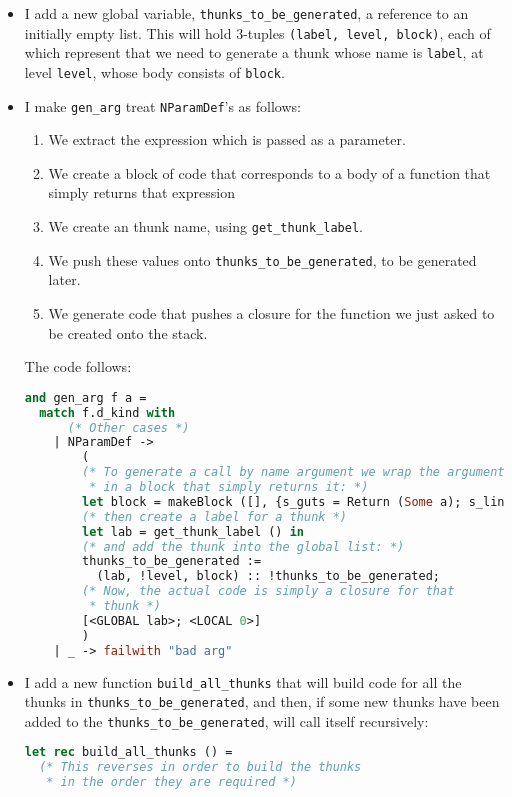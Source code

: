 \documentclass[a4paper,10pt]{article}
\begin{document}
\begin{itemize}
\item I add a new global variable, \texttt{thunks\_to\_be\_generated}, a reference to an initially empty list. This will hold 3-tuples \texttt{(label, level, block)}, each of which represent that we need to generate a thunk whose name is \texttt{label}, at level \texttt{level}, whose body consists of \texttt{block}.

\item I make \texttt{gen\_arg} treat \texttt{NParamDef}'s as follows:
    \begin{enumerate}
        \item We extract the expression which is passed as a parameter.
        \item We create a block of code that corresponds to a body of a function that simply returns that expression
        \item We create an thunk name, using \texttt{get\_thunk\_label}.
        \item We push these values onto \texttt{thunks\_to\_be\_generated}, to be generated later.
        \item We generate code that pushes a closure for the function we just asked to be created onto the stack.
    \end{enumerate}
    The code follows:
\begin{lstlisting}[language=ml]
and gen_arg f a = 
  match f.d_kind with
      (* Other cases *)
    | NParamDef ->
        (
        (* To generate a call by name argument we wrap the argument expression 
         * in a block that simply returns it: *)
        let block = makeBlock ([], {s_guts = Return (Some a); s_line = -1}) in
        (* then create a label for a thunk *)
        let lab = get_thunk_label () in
        (* and add the thunk into the global list: *)
        thunks_to_be_generated := 
          (lab, !level, block) :: !thunks_to_be_generated;
        (* Now, the actual code is simply a closure for that
         * thunk *)
        [<GLOBAL lab>; <LOCAL 0>]
        )
    | _ -> failwith "bad arg"
\end{lstlisting}
    \item I add a new function \texttt{build\_all\_thunks} that will build code for all the thunks in \texttt{thunks\_to\_be\_generated}, and then, if some new thunks have been added to the \texttt{thunks\_to\_be\_generated}, will call itself recursively:
\begin{lstlisting}[language=ml]
let rec build_all_thunks () =
  (* This reverses in order to build the thunks
   * in the order they are required *)

\end{lstlisting}
\end{itemize}
\end{document}
